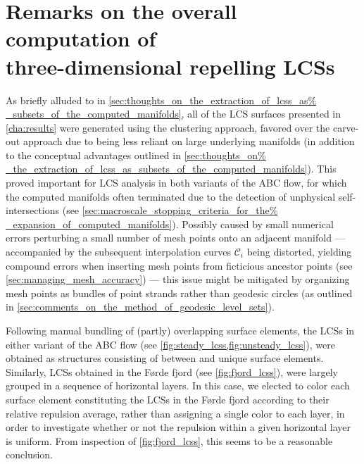 \section[Remarks on the overall computation of three-dimensional repelling
LCSs]{Remarks on the overall computation of \\\phantom{5.5} three-dimensional
repelling LCSs}
\label{sec:remarks_on_the_overall_computation_of_three_dimensional_repelling_lcss}

As briefly alluded to in \cref{sec:thoughts_on_the_extraction_of_lcss_as%
_subsets_of_the_computed_manifolds}, all of the LCS surfaces presented in
\cref{cha:results} were generated using the clustering approach, favored over
the carve-out approach due to being less reliant on large underlying manifolds
(in addition to the conceptual advantages outlined in \cref{sec:thoughts_on%
_the_extraction_of_lcss_as_subsets_of_the_computed_manifolds}). This proved
important for LCS analysis in both variants of the ABC flow, for which the
computed manifolds often terminated due to the detection of unphysical
self-intersections (see \cref{sec:macroscale_stopping_criteria_for_the%
_expansion_of_computed_manifolds}). Possibly caused by small numerical errors
perturbing a small number of mesh points onto an adjacent manifold ---
accompanied by the subsequent interpolation curves $\mathcal{C}_{i}$ being
distorted, yielding compound errors when inserting mesh points from ficticious
ancestor points (see \cref{sec:managing_mesh_accuracy}) --- this issue might be
mitigated by organizing mesh points as bundles of point strands rather than
geodesic circles (as outlined in
\cref{sec:comments_on_the_method_of_geodesic_level_sets}).

Following manual bundling of (partly) overlapping surface elements, the LCSs in
either variant of the ABC flow (see \cref{fig:steady_lcss,fig:unsteady_lcss}),
were obtained as structures consisting of between  and
 unique surface elements. Similarly, LCSs obtained in the Førde
fjord (see \cref{fig:fjord_lcss}), were largely grouped in a sequence of
horizontal layers. In this case, we elected to color each surface element
constituting the LCSs in the Førde fjord according to their relative repulsion
average, rather than assigning a single color to each layer, in order to
investigate whether or not the repulsion within a given horizontal layer is
uniform. From inspection of \cref{fig:fjord_lcss}, this seems to be a
reasonable conclusion.

